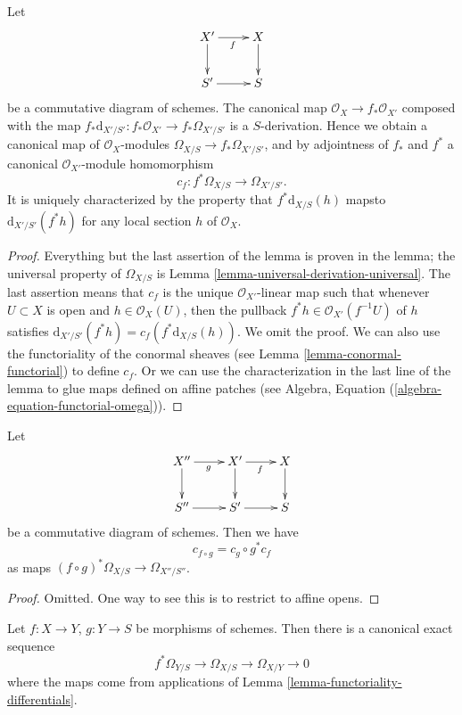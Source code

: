 \begin{lemma}
\label{lemma-functoriality-differentials}
Let
$$
\xymatrix{
X' \ar[d] \ar[r]_f & X \ar[d] \\
S' \ar[r] & S
}
$$
be a commutative diagram of schemes. The canonical map
$\mathcal{O}_X \to f_*\mathcal{O}_{X'}$ composed with the map
$f_*\text{d}_{X'/S'} : f_*\mathcal{O}_{X'} \to f_*\Omega_{X'/S'}$ is a
$S$-derivation. Hence we obtain a canonical map of $\mathcal{O}_X$-modules
$\Omega_{X/S} \to f_*\Omega_{X'/S'}$, and by
adjointness of $f_*$ and $f^*$ a
canonical $\mathcal{O}_{X'}$-module homomorphism
$$
c_f : f^*\Omega_{X/S} \longrightarrow \Omega_{X'/S'}.
$$
It is uniquely characterized by the property that
$f^*\text{d}_{X/S}(h)$ mapsto $\text{d}_{X'/S'}(f^* h)$
for any local section $h$ of $\mathcal{O}_X$.
\end{lemma}

\begin{proof}
Everything but the last assertion of the lemma is proven in the lemma;
the universal property of $\Omega_{X/S}$ is
Lemma \ref{lemma-universal-derivation-universal}.
The last assertion means that $c_f$ is the unique $\mathcal{O}_{X'}$-linear
map such that whenever $U \subset X$ is open and $h \in \mathcal{O}_X(U)$,
then the pullback $f^*h \in \mathcal{O}_{X'}(f^{-1}U)$ of $h$ satisfies
$\text{d}_{X'/S'}(f^*h) = c_f(f^*\text{d}_{X/S}(h))$. We omit the proof.
We can also use the functoriality of the conormal sheaves
(see Lemma \ref{lemma-conormal-functorial}) to define $c_f$.
Or we can use the characterization in the last line of the lemma to
glue maps defined on affine patches
(see Algebra, Equation (\ref{algebra-equation-functorial-omega})).
\end{proof}

\begin{lemma}
\label{lemma-check-functoriality-differentials}
Let
$$
\xymatrix{
X'' \ar[d] \ar[r]_g & X' \ar[d] \ar[r]_f & X \ar[d] \\
S'' \ar[r] & S' \ar[r] & S
}
$$
be a commutative diagram of schemes. Then we have
$$
c_{f \circ g} = c_g \circ g^* c_f
$$
as maps $(f \circ g)^*\Omega_{X/S} \to \Omega_{X''/S''}$.
\end{lemma}

\begin{proof}
Omitted. One way to see this is to restrict to affine opens.
\end{proof}

\begin{lemma}
\label{lemma-triangle-differentials}
Let $f : X \to Y$, $g : Y \to S$ be morphisms of schemes.
Then there is a canonical exact sequence
$$
f^*\Omega_{Y/S} \to \Omega_{X/S} \to \Omega_{X/Y} \to 0
$$
where the maps come from applications of
Lemma \ref{lemma-functoriality-differentials}.
\end{lemma}

